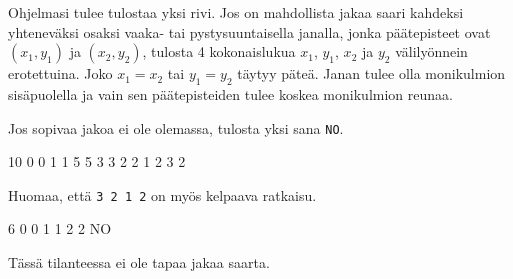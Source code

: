 \documentclass{boi2014-fi}
\newcommand{\constant}[1]{{\tt #1}}
\begin{document}
    \Output
    Ohjelmasi tulee tulostaa yksi rivi.
    Jos on mahdollista jakaa saari kahdeksi yhteneväksi osaksi
    vaaka- tai pystysuuntaisella janalla,
    jonka päätepisteet ovat $(x_1, y_1)$ ja $(x_2, y_2)$,
    tulosta 4 kokonaislukua $x_1$,
    $y_1$, $x_2$ ja $y_2$ välilyönnein erotettuina.
    Joko $x_1 = x_2$ tai $y_1 = y_2$ täytyy päteä.
    Janan tulee olla monikulmion sisäpuolella ja vain sen
    päätepisteiden tulee koskea monikulmion reunaa.
    
    Jos sopivaa jakoa ei ole olemassa, tulosta yksi sana \constant{NO}.

    \clearpage

    \Examples
    \example
    {
        10  0  0  1  1  5  5  3  3  2  2
    }
    {
        1 2 3 2
    }
    {
        Huomaa, että {\tt 3 2 1 2} on myös kelpaava ratkaisu.

        \begin{center}
        \end{center}
    }

    \example
    {
        6  0  0  1  1  2  2
    }
    {
        NO
    }
    {
        Tässä tilanteessa ei ole tapaa jakaa saarta.
        \begin{center}
        \end{center}
    }
\end{document}
